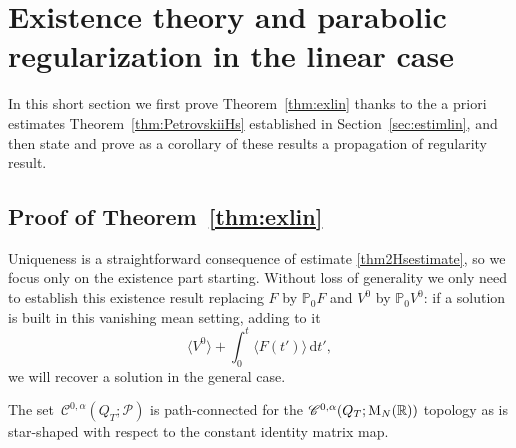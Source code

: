 \documentclass[10pt]{amsart}
\theoremstyle{definition}
\newcommand\R{\mathbb{R}}
\newcommand\dd{\mathrm{d}}
\begin{document}
\section{Existence theory and parabolic regularization in the linear case}\label{sec:exlin}
In this short section we first prove Theorem~\ref{thm:exlin} thanks to the a priori estimates Theorem~\ref{thm:PetrovskiiHs} established in Section~\ref{sec:estimlin}, and then state and prove as a corollary of these results a propagation of regularity result.

\subsection{Proof of Theorem~\ref{thm:exlin}}

Uniqueness is a straightforward consequence of estimate \eqref{thm2Hsestimate}, so we focus only on the existence part starting. Without loss of generality we only need to establish this existence result replacing $F$ by $\mathbb{P}_0 F$ and $V^0$ by $\mathbb{P}_0 V^0$: if a solution is built in this vanishing mean setting, adding to it
\[
\langle V^0\rangle + \int_0^t \langle F(t')\rangle\,\dd t',
\]
we will recover a solution in the general case.

The set~$\mathscr{C}^{0,\alpha}(Q_T;\mathscr{P})$ is path-connected for the $\mathscr{C}^{0,\alpha}(Q_T;\textnormal{M}_N(\R))$ topology as is star-shaped with respect to the constant identity matrix map.
\end{document}
